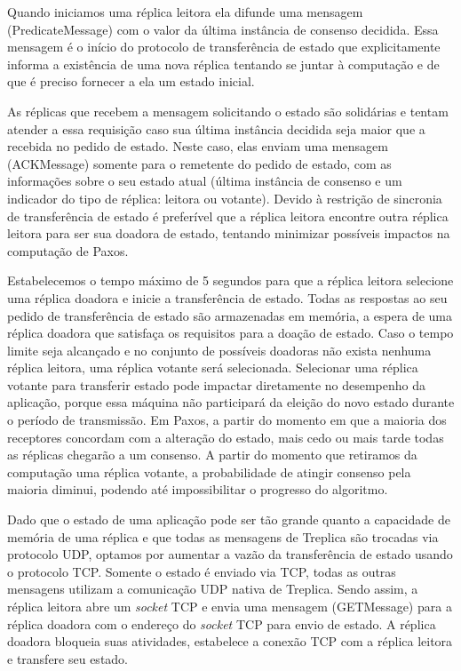 Quando iniciamos uma réplica leitora ela difunde uma mensagem (PredicateMessage) com o
valor da última instância de consenso decidida. Essa mensagem é o início do protocolo de
transferência de estado que explicitamente informa a existência de uma nova réplica
tentando se juntar à computação e de que é preciso fornecer a ela um estado inicial.

As réplicas que recebem a mensagem solicitando o estado são solidárias e tentam atender a
essa requisição caso sua última instância decidida seja maior que a recebida no pedido de
estado. Neste caso, elas enviam uma mensagem (ACKMessage) somente para o remetente
do pedido de estado, com as informações sobre o seu estado atual (última instância de
consenso e um indicador do tipo de réplica: leitora ou votante). Devido à restrição de
sincronia de transferência de estado é preferível que a réplica leitora encontre outra
réplica leitora para ser sua doadora de estado, tentando minimizar possíveis impactos na
computação de Paxos.

Estabelecemos o tempo máximo de 5 segundos para que a réplica leitora selecione uma
réplica doadora e inicie a transferência de estado. Todas as respostas ao seu pedido de
transferência de estado são armazenadas em memória, a espera de uma réplica doadora que
satisfaça os requisitos para a doação de estado. Caso o tempo limite seja alcançado e no
conjunto de possíveis doadoras não exista nenhuma réplica leitora, uma réplica votante
será selecionada. Selecionar uma réplica votante para transferir estado pode impactar
diretamente no desempenho da aplicação, porque essa máquina não participará da eleição do
novo estado durante o período de transmissão. Em Paxos, a partir do momento em que a
maioria dos receptores concordam com a alteração do estado, mais cedo ou mais tarde todas
as réplicas chegarão a um consenso. A partir do momento que retiramos da computação uma
réplica votante, a probabilidade de atingir consenso pela maioria diminui, podendo até
impossibilitar o progresso do algoritmo.

Dado que o estado de uma aplicação pode ser tão grande quanto a capacidade de memória de
uma réplica e que todas as mensagens de Treplica são trocadas via protocolo UDP, optamos
por aumentar a vazão da transferência de estado usando o protocolo TCP. Somente o estado é
enviado via TCP, todas as outras mensagens utilizam a comunicação UDP nativa de Treplica.
Sendo assim, a réplica leitora abre um \emph{socket} TCP e envia uma mensagem
(GETMessage) para a réplica doadora com o endereço do \emph{socket} TCP para envio de
estado. A réplica doadora bloqueia suas atividades, estabelece a conexão TCP com a réplica
leitora e transfere seu estado.

